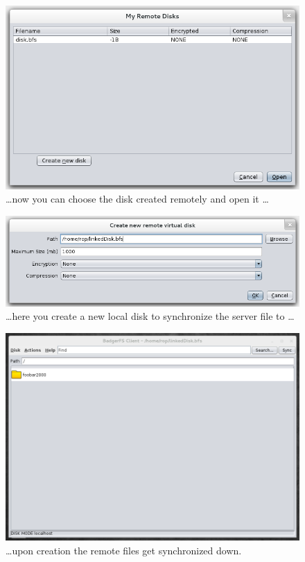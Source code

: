 \begin{figure}[h!]
\centering
\includegraphics[width=1\textwidth]{figures/serverUseCase/10_choose_disk.png}
\caption{\ldots now you can choose the disk created remotely and open it \ldots}
\end{figure}

\begin{figure}[h!]
\centering
\includegraphics[width=1\textwidth]{figures/serverUseCase/11choose_localdisk.png}
\caption{\ldots here you create a new local disk to synchronize the server file
to \ldots}
\label{fig:11choose_localdisk.png}
\end{figure}

\begin{figure}[h!]
\centering
\includegraphics[width=1\textwidth]{figures/serverUseCase/12_sychronized_down.png}
\caption{\ldots upon creation the remote files get synchronized down.}
\label{fig:12_sychronized_down.png}
\end{figure}

